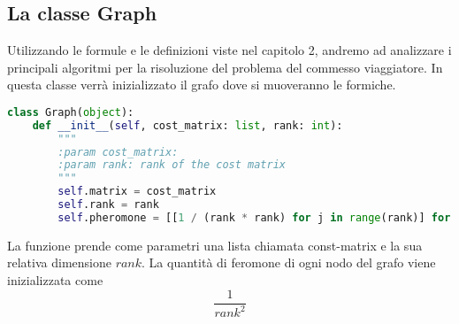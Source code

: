 \documentclass[a4paper,12pt]{report}
\begin{document}
\subsection{La classe Graph}
Utilizzando le formule e le definizioni viste nel capitolo 2, andremo ad analizzare i principali algoritmi per la risoluzione del problema del commesso viaggiatore. In questa classe verrà inizializzato il grafo dove si muoveranno le formiche.
\begin{lstlisting}[language=Python]
class Graph(object):
    def __init__(self, cost_matrix: list, rank: int):
        """
        :param cost_matrix:
        :param rank: rank of the cost matrix
        """
        self.matrix = cost_matrix
        self.rank = rank
        self.pheromone = [[1 / (rank * rank) for j in range(rank)] for i in range(rank)]
\end{lstlisting}
La funzione prende come parametri una lista chiamata const-matrix e la sua relativa dimensione $rank$.
La quantità di feromone di ogni nodo del grafo viene inizializzata come
    \begin{equation}
        \frac{1}{rank^2}
    \end{equation}
\end{document}
